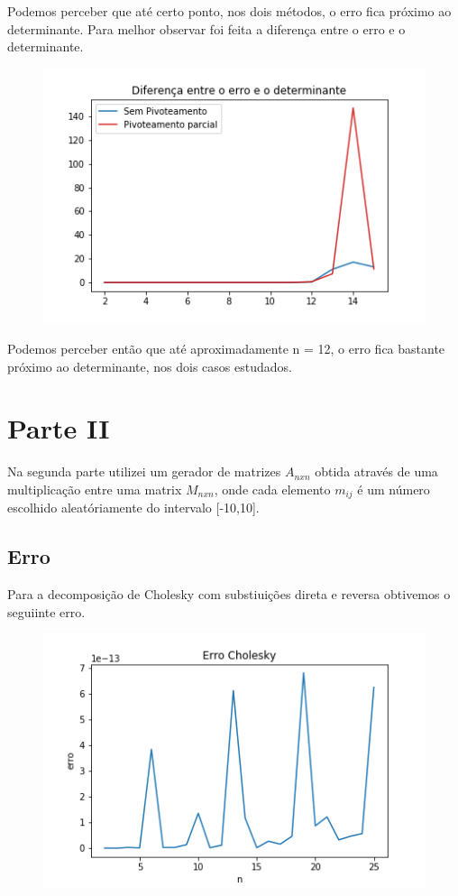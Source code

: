 \documentclass{article}
\begin{document}
\par Podemos perceber que até certo ponto, nos dois métodos, o erro fica próximo ao determinante. Para melhor observar foi feita a diferença entre o erro e o determinante.

\begin{figure}[!ht]
    \centering
    \includegraphics[scale=0.5]{image6.png}
    \label{fig:my_label}
\end{figure}

\newpage 

\par Podemos perceber então que até aproximadamente n = 12, o erro fica bastante próximo ao determinante, nos dois casos estudados.


\section{Parte II}
Na segunda parte utilizei um gerador de matrizes $A_{nxn}$ obtida através de uma multiplicação entre uma matrix $M_{nxn}$, onde cada elemento $m_{ij}$ é um número escolhido aleatóriamente do intervalo [-10,10].

\subsection{Erro}

\par Para a decomposição de Cholesky com substiuições direta e reversa obtivemos o seguiinte erro.

\begin{figure}[ht]
    \centering
    \includegraphics[scale=0.5]{erro_cholesky1.png}
    \label{fig:my_label}
\end{figure}
\end{document}
